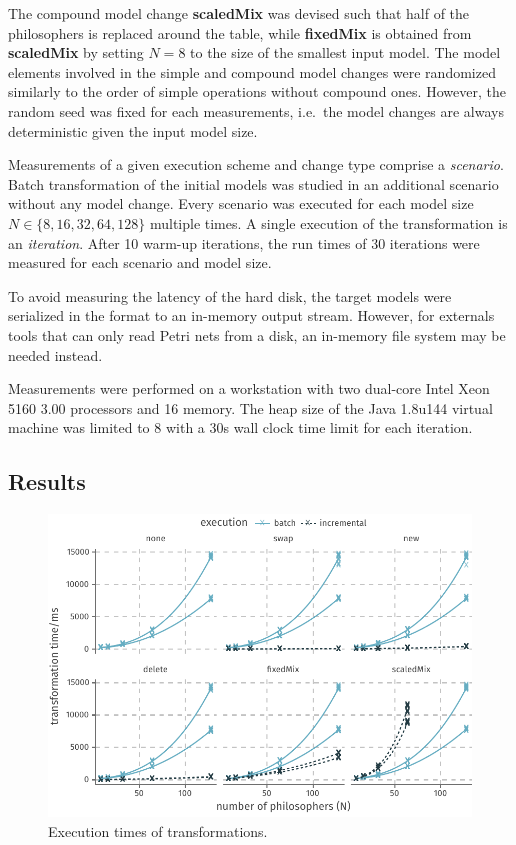 The compound model change \textbf{scaled\-Mix} was devised such that half of the philosophers is replaced around the table, while \textbf{fixed\-Mix} is obtained from \textbf{scaled\-Mix} by setting \(N = 8\) to the size of the smallest input model. The model elements involved in the simple and compound model changes were randomized similarly to the order of simple operations without compound ones. However, the random seed was fixed for each measurements, i.e.~the model changes are always deterministic given the input model size.

Measurements of a given execution scheme and change type comprise a \emph{scenario}. Batch transformation of the initial models was studied in an additional scenario without any model change. Every scenario was executed for each model size \(N \in \{8, 16, 32, 64, 128\}\) multiple times. A single execution of the transformation is an \emph{iteration}. After 10 warm-up iterations, the run times of 30 iterations were measured for each scenario and model size.

To avoid measuring the latency of the hard disk, the target  models were serialized in the  format to an in-memory output stream. However, for externals tools that can only read Petri nets from a disk, an in-memory file system may be needed instead.

Measurements were performed on a workstation with two dual-core Intel Xeon 5160 3.00\thinspace {} processors and 16\thinspace {} memory. The heap size of the Java 1.8u144 virtual machine was limited to 8\thinspace {} with a 30\thinspace s wall clock time limit for each iteration.

\subsection{Results}

\begin{figure}
  \centering
  \includegraphics{figures/plot_execution}
  \caption{Execution times of transformations.}
  \label{fig:apply:plot-execution}
\end{figure}

